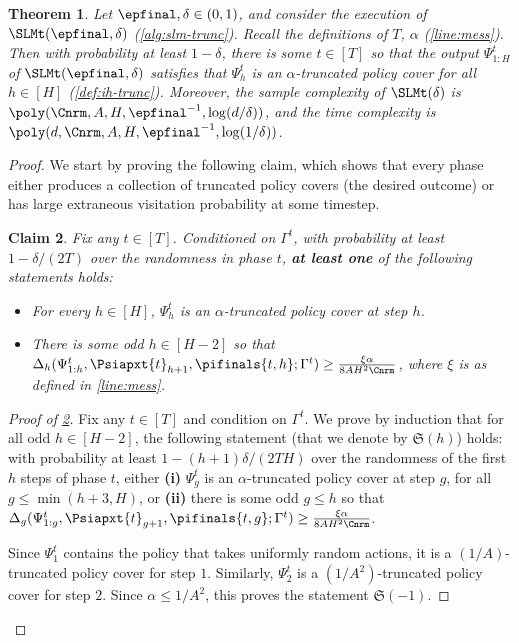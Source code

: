 \documentclass[11pt, oneside]{article}
\theoremstyle{plain}
\newtheorem{theorem}{Theorem}
\newtheorem{claim}[theorem]{Claim}
\theoremstyle{definition}
\numberwithin{theorem}{section}
\renewcommand{\^}[1]{^{(#1)}}
\begin{document}
 
  \begin{theorem}\label{theorem:main-pc-trunc}
  Let $\epfinal,\delta\in(0,1)$, and consider the execution of $\SLMt(\epfinal,\delta)$ (\cref{alg:slm-trunc}). Recall the definitions of $T$, $\alpha$ (\cref{line:mess}). Then with probability at least $1-\delta$, there is some $t \in [T]$ so that the output $\Psi_{1:H}^t$ of $\SLMt(\epfinal,\delta)$  satisfies that $\Psi_h^t$ is an $\alpha$-truncated policy cover for all $h \in [H]$ (\cref{def:ih-trunc}). Moreover, the sample complexity of $\SLMt(\delta)$ is $\poly(\Cnrm,A,H,\epfinal^{-1}, \log(d/\delta))$, and the time complexity is $\poly(d,\Cnrm,A,H,\epfinal^{-1},\log(1/\delta))$.
\end{theorem}

\begin{proof}
  We start by proving the following claim, which shows that every phase either produces a collection of truncated policy covers (the desired outcome) or has large extraneous visitation probability at some timestep. 
  \begin{claim}
    \label{clm:slmdp-inductive-step}
    Fix any $t \in [T]$. Conditioned on $\Gamma^t$, with probability at least $1-\delta/(2T)$ over the randomness in phase $t$, \textbf{at least one} of the following statements holds: %
  \begin{itemize}
  \item For every $h \in [H]$, $\Psi_h^t$ is an $\alpha$-truncated policy cover at step $h$. %
  \item There is some odd $h \in [H-2]$ so that $\Delta_h(\Psi_{1:h}^t, \Psiapxt{t}_{h+1}, \pifinals{t,h};\Gamma^t) \geq \frac{\xi\alpha}{8AH^2 \Cnrm}$, where $\xi$ is as defined in \cref{line:mess}.
  \end{itemize}
\end{claim}
\begin{proof}[Proof of \cref{clm:slmdp-inductive-step}]
  Fix any $t \in [T]$ and condition on $\Gamma^t$. We prove by induction that for all odd $h \in [H-2]$, the following statement (that we denote by $\mathfrak{S}(h)$) holds: with probability at least $1-(h+1)\delta/(2TH)$ over the randomness of the first $h$ steps of phase $t$, either \textbf{(i)} $\Psi_g^t$ is an $\alpha$-truncated policy cover at step $g$, for all $g \leq \min(h+3,H)$, or \textbf{(ii)} there is some odd $g \leq h$ so that $\Delta_g(\Psi_{1:g}^t,\Psiapxt{t}_{g+1},\pifinals{t,g};\Gamma^t) \geq \frac{\xi\alpha}{8AH^2\Cnrm}$.
  
  Since $\Psi_1^t$ contains the policy that takes uniformly random actions, it is a $(1/A)$-truncated policy cover for step $1$. Similarly, $\Psi_2^t$ is a $(1/A^2)$-truncated policy cover for step $2$. Since $\alpha \leq 1/A^2$, this proves the statement $\mathfrak{S}(-1)$.


\end{proof}
\end{proof}
\end{document}
